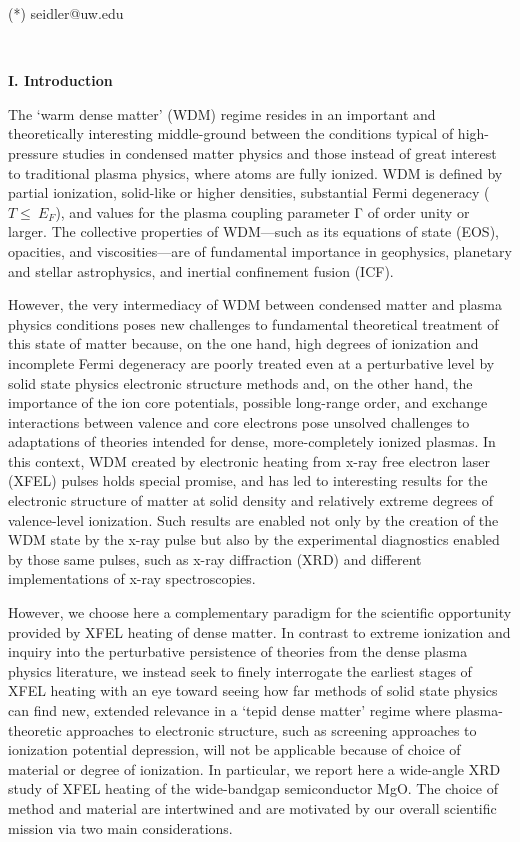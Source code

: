 (*) seidler@uw.edu

\textbf{\\}

\textbf{I. Introduction}

The `warm dense matter' (WDM) regime resides in an important and
theoretically interesting middle-ground between the conditions typical
of high-pressure studies in condensed matter physics and those instead
of great interest to traditional plasma physics, where atoms are fully
ionized. WDM is defined by partial ionization, solid-like or higher
densities, substantial Fermi degeneracy (\(T \leq \ E_{F}\)), and values
for the plasma coupling parameter Γ of order unity or larger. \cite{koenig2005progress}
The collective properties of WDM---such as its equations of state (EOS),
opacities, and viscosities---are of fundamental importance in
geophysics, planetary and stellar astrophysics, and inertial confinement
fusion (ICF). \cite{atzeni2004physics}

However, the very intermediacy of WDM between condensed matter and
plasma physics conditions poses new challenges to fundamental
theoretical treatment of this state of matter because, on the one hand,
high degrees of ionization and incomplete Fermi degeneracy are poorly
treated even at a perturbative level by solid state physics electronic
structure methods and, on the other hand, the importance of the ion core
potentials, possible long-range order, and exchange interactions between
valence and core electrons pose unsolved challenges to adaptations of
theories intended for dense, more-completely ionized plasmas. In this
context, WDM created by electronic heating from x-ray free electron
laser (XFEL) pulses holds special promise, and has led to interesting
results for the electronic structure of matter at solid density and
relatively extreme degrees of valence-level ionization. \cite{rackstraw2015saturable, ciricosta2016measurements} Such
results are enabled not only by the creation of the WDM state by the
x-ray pulse but also by the experimental diagnostics enabled by those
same pulses, such as x-ray diffraction (XRD) and different
implementations of x-ray spectroscopies. \cite{chase2016ultrafast, yano2009x, mcneil2010x, chapman2011femtosecond}

However, we choose here a complementary paradigm for the scientific
opportunity provided by XFEL heating of dense matter. In contrast to
extreme ionization and inquiry into the perturbative persistence of
theories from the dense plasma physics literature, we instead seek to
finely interrogate the earliest stages of XFEL heating with an eye
toward seeing how far methods of solid state physics can find new,
extended relevance in a `tepid dense matter' regime where
plasma-theoretic approaches to electronic structure, such as screening
approaches to ionization potential depression, will not be applicable
because of choice of material or degree of ionization. In particular, we
report here a wide-angle XRD study of XFEL heating of the wide-bandgap
semiconductor MgO. The choice of method and material are intertwined and
are motivated by our overall scientific mission via two main
considerations.

